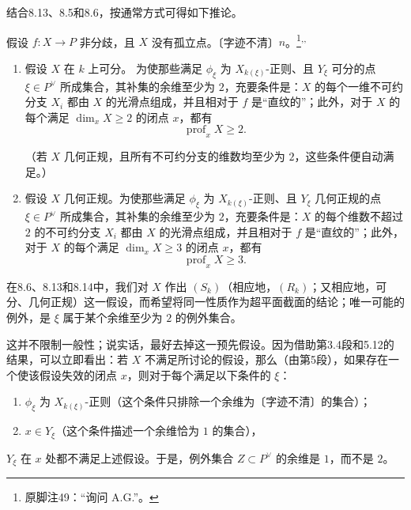 结合8.13、8.5和8.6，按通常方式可得如下推论。

假设 $f\colon X\to P$ 非分歧，且 $X$ 没有孤立点。〔字迹不清〕$n$。\footnote{原脚注49：“询问 A.G.”。}\textsuperscript{,}\textsuperscript{,}
\begin{enumerate}
\item[(a)] 假设 $X$ 在 $k$ 上可分。
为使那些满足 $\phi_\xi$ 为 $X_{k(\xi)}$-正则、且 $Y_\xi$ 可分的点 $\xi\in P^\vee$ 所成集合，其补集的余维至少为 $2$，充要条件是：$X$ 的每个一维不可约分支 $X_i$ 都由 $X$ 的光滑点组成，并且相对于 $f$ 是“直纹的”；此外，对于 $X$ 的每个满足 $\dim_x X\ge2$ 的闭点 $x$，都有
\[
\operatorname{prof}_x X\ge2.
\]

（若 $X$ 几何正规，且所有不可约分支的维数均至少为 $2$，这些条件便自动满足。）
\item[(b)] 假设 $X$ 几何正规。为使那些满足 $\phi_\xi$ 为 $X_{k(\xi)}$-正则、且 $Y_\xi$ 几何正规的点 $\xi\in P^\vee$ 所成集合，其补集的余维至少为 $2$，充要条件是：$X$ 的每个维数不超过 $2$ 的不可约分支 $X_i$ 都由 $X$ 的光滑点组成，并且相对于 $f$ 是“直纹的”；此外，对于 $X$ 的每个满足 $\dim_x X\ge3$ 的闭点 $x$，都有
\[
\operatorname{prof}_x X\ge3.
\]
\end{enumerate}

在8.6、8.13和8.14中，我们对 $X$ 作出 $(S_k)$（相应地，$(R_k)$；又相应地，可分、几何正规）这一假设，而希望将同一性质作为超平面截面的结论；唯一可能的例外，是 $\xi$ 属于某个余维至少为 $2$ 的例外集合。

这并不限制一般性；说实话，最好去掉这一预先假设。因为借助第3.4段和5.12的结果，可以立即看出：若 $X$ 不满足所讨论的假设，那么（由第5段），如果存在一个使该假设失效的闭点 $x$，则对于每个满足以下条件的 $\xi$：
\begin{enumerate}
\item $\phi_\xi$ 为 $X_{k(\xi)}$-正则（这个条件只排除一个余维为〔字迹不清〕的集合）；
\item $x\in Y_\xi$（这个条件描述一个余维恰为 $1$ 的集合），
\end{enumerate}
$Y_\xi$ 在 $x$ 处都不满足上述假设。于是，例外集合 $Z\subset P^\vee$ 的余维是 $1$，而不是 $2$。

